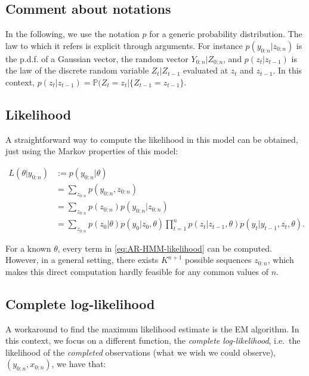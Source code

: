 \documentclass[]{book}
\begin{document}
\subsection{Comment about notations}\label{comment-about-notations}

In the following, we use the notation \(p\) for a generic probability
distribution. The law to which it refers is explicit through arguments.
For instance \(p(y_{0:n} \vert z_{0:n})\) is the p.d.f. of a Gaussian
vector, the random vector \(Y_{0:n}\vert Z_{0:n}\), and
\(p(z_t\vert z_{t - 1})\) is the law of the discrete random variable
\(Z_{t} \vert Z_{t - 1}\) evaluated at \(z_t\) and \(z_{t -1}\). In this
context,
\(p(z_t\vert z_{t - 1}) = \mathbb{P}(Z_t = z_t \vert \lbrace Z_{t-1} = z_{t -1}\rbrace.\)

\subsection{Likelihood}\label{likelihood}

A straightforward way to compute the likelihood in this model can be
obtained, just using the Markov properties of this model:

\begin{align}
L(\theta \vert y_{0:n}) &:= p(y_{0:n} \vert \theta) \nonumber \\
&= \sum_{z_{0:n}} p(y_{0:n}, z_{0:n}) \nonumber \\
&= \sum_{z_{0:n}} p(z_{0:n})p(y_{0:n}\vert z_{0:n}) \nonumber \\
&=  \sum_{z_{0:n}} p(z_0 \vert \theta) p(y_0\vert z_0, \theta) \prod_{t = 1}^n p(z_{t} \vert z_{t - 1}, \theta)p(y_{t}\vert y_{t -1}, z_{t}, \theta)  \label{eq:AR-HMM-likelihood}.
\end{align}

For a known \(\theta\), every term in \eqref{eq:AR-HMM-likelihood} can be
computed. However, in a general setting, there exists \(K^{n + 1}\)
possible sequences \(z_{0:n}\), which makes this direct computation
hardly feasible for any common values of \(n\).

\subsection{Complete log-likelihood}\label{complete-log-likelihood}

A workaround to find the maximum likelihood estimate is the EM
algorithm. In this context, we focus on a different function, the
\emph{complete log-likelihood}, i.e.~the likelihood of the
\emph{completed} observations (what we wish we could observe),
\((y_{0:n}, x_{0:n})\), we have that:
\end{document}
